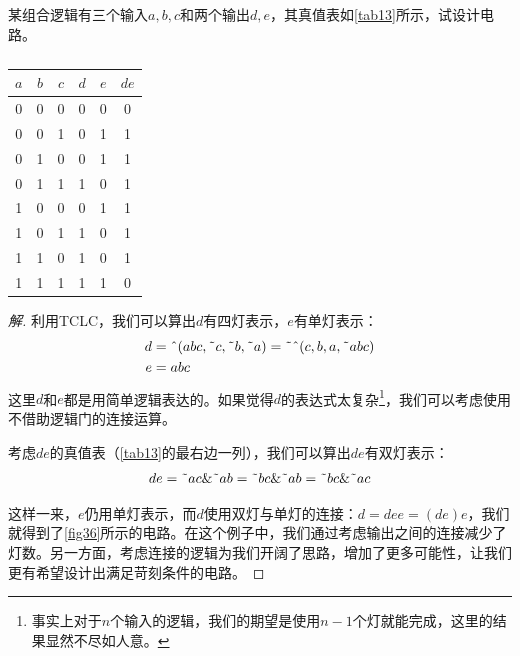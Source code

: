 \begin{example}{}{}\label{exa3}
  某组合逻辑有三个输入$a,b,c$和两个输出$d,e$，其真值表如\autoref{tab13}所示，试设计电路。
  \begin{table}[H]
    \centering
    \begin{tabular}{|ccc|cc|c|}
      \hline
      $a$ & $b$ & $c$ & $d$ & $e$ & $de$ \\\hline
      0   & 0   & 0   & 0   & 0   & 0 \\\hline
      0   & 0   & 1   & 0   & 1   & 1 \\\hline
      0   & 1   & 0   & 0   & 1   & 1 \\\hline
      0   & 1   & 1   & 1   & 0   & 1 \\\hline
      1   & 0   & 0   & 0   & 1   & 1 \\\hline
      1   & 0   & 1   & 1   & 0   & 1 \\\hline
      1   & 1   & 0   & 1   & 0   & 1 \\\hline
      1   & 1   & 1   & 1   & 1   & 0 \\\hline
    \end{tabular}
    \caption{}\label{tab13}
  \end{table}
  \begin{proof}[解]
    利用TCLC，我们可以算出$d$有四灯表示，$e$有单灯表示：
    \begin{align*}
      d & =\textnormal{\^{}}(abc,\textnormal{\~{}}c,\textnormal{\~{}}b,\textnormal{\~{}}a)=\textnormal{\~{}}\textnormal{\^{}}(c,b,a,\textnormal{\~{}}abc) \\
      e & =abc
    \end{align*}
    这里$d$和$e$都是用简单逻辑表达的。如果觉得$d$的表达式太复杂\footnote{事实上对于$n$个输入的逻辑，我们的期望是使用$n-1$个灯就能完成，这里的结果显然不尽如人意。}，我们可以考虑使用不借助逻辑门的连接运算。

    考虑$de$的真值表（\autoref{tab13}的最右边一列），我们可以算出$de$有双灯表示：
    $$de=\textnormal{\~{}}ac\&\textnormal{\~{}}ab=\textnormal{\~{}}bc\&\textnormal{\~{}}ab=\textnormal{\~{}}bc\&\textnormal{\~{}}ac$$

    \begin{figure}[H]
      \centering
      \caption{}\label{fig36}
    \end{figure}

    这样一来，$e$仍用单灯表示，而$d$使用双灯与单灯的连接：$d=dee=(de)e$，我们就得到了\autoref{fig36}所示的电路。在这个例子中，我们通过考虑输出之间的连接减少了灯数。另一方面，考虑连接的逻辑为我们开阔了思路，增加了更多可能性，让我们更有希望设计出满足苛刻条件的电路。
  \end{proof}
\end{example}


